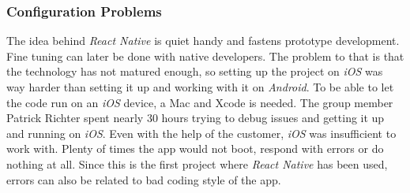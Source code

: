 \subsubsection{Configuration Problems}
\label{sssec:configuration_problems}

The idea behind \textit{React Native} is quiet handy and fastens prototype development. Fine tuning can later be done with native developers. The problem to that is that the technology has not matured enough, so setting up the project on \textit{iOS} was way harder than setting it up and working with it on \textit{Android}.
\newline
To be able to let the code run on an \textit{iOS} device, a Mac and Xcode is needed. The group member Patrick Richter spent nearly 30 hours trying to debug issues and getting it up and running on \textit{iOS}. Even with the help of the customer, \textit{iOS} was insufficient to work with. Plenty of times the app would not boot, respond with errors or do nothing at all. Since this is the first project where \textit{React Native} has been used, errors can also be related to bad coding style of the app.